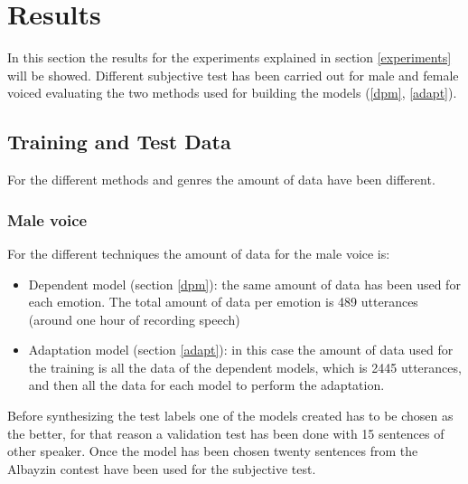 \section{Results}\label{results}
In this section the results for the experiments explained in section \ref{experiments} will be showed. Different subjective test has been carried out for male and female voiced evaluating the two methods used for building the models (\ref{dpm}, \ref{adapt}).\\
\subsection{Training and Test Data}\label{ttd}
For the different methods and genres the amount of data have been different.
\subsubsection{Male voice}
For the different techniques the amount of data for the male voice is:
\begin{itemize}
	\item Dependent model (section \ref{dpm}): the same amount of data has been used for each emotion. The total amount of data per emotion is 489 utterances (around one hour of recording speech)
	\item Adaptation model (section \ref{adapt}): in this case the amount of data used for the training is all the data of the dependent models, which is 2445 utterances, and then all the data for each model to perform the adaptation.
\end{itemize}
Before synthesizing the test labels one of the models created has to be chosen as the better, for that reason a validation test has been done with 15 sentences of other speaker. Once the model has been chosen twenty sentences from the Albayzin contest have been used for the subjective test.

